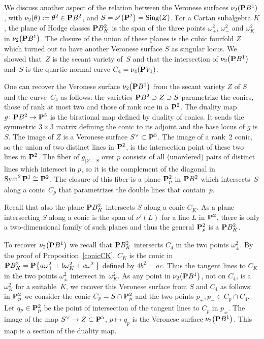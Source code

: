 \documentclass[pdftex]{sigma}
\numberwithin{equation}{section}
\begin{document}
\begin{Remark}\label{remveroneses}
We discuss another aspect of the relation between the Veronese surfaces $\nu_2({\bf P} B^1)$,
with $\nu_2(\theta):=\theta^2\in {\bf P} B^2$, and $S=\nu'\big({\bf P}^2\big)=\operatorname{Sing}(Z)$.
For a Cartan subalgebra $K$, the plane of Hodge classes ${\bf P} B^2_K$ is the span of the
three points $\omega_+^2$, $\omega_-^2$ and $\omega_K^2$ in $\nu_2\big({\bf P} B^1\big)$. The closure of
the union of these planes is the cubic fourfold $Z$ which turned out to have another Veronese surface
$S$ as singular locus.
We showed that~$Z$ is the secant variety of~$S$
and that the intersection of $\nu_2\big({\bf P} B^1\big)$ and~$S$ is the quartic normal curve
$C_4=\nu_4({\bf P} V_1)$.

One can recover the Veronese surface $\nu_2\big({\bf P} B^1\big)$ from the secant variety $Z$ of $S$ and the
curve~$C_4$ as follows: the varieties ${\bf P} B^2\supset Z\supset S$
parametrize the conics, those of rank at most two and those of rank one in a ${\bf P}^2$.
The duality map $g\colon {\bf P} B^2\rightarrow {\bf P}^5$ is the birational map defined by
duality of conics. It sends the symmetric $3\times 3$ matrix defining the conic to its adjoint and
the base locus of $g$ is $S$.
The image of $Z$ is a Veronese surface $S^\vee\subset{\bf P}^5$. The image of a rank~2 conic,
so the union of two distinct lines in ${\bf P}^2$, is the intersection point of these two lines in ${\bf P}^2$.
The fiber of $g_{|Z-S}$ over $p$ consists of all (unordered) pairs of distinct lines
which intersect in $p$, so it is the complement of the diagonal in $\operatorname{Sym}^2{\bf P}^1\cong {\bf P}^2$.
The closure of this fiber is a plane ${\bf P}^2_p$ in ${\bf P} B^2$ which intersects~$S$ along a conic~$C_p$
that parametrizes the double lines that contain~$p$.

Recall that also the plane ${\bf P} B^2_K$ intersects $S$ along a conic $C_K$. As a plane intersecting
$S$ along a conic is the span of $\nu'(L)$ for a line $L$ in ${\bf P}^2$, there is only
a two-dimensional family of such planes and thus the general ${\bf P}^2_p$ is a ${\bf P} B^2_K$.

To recover $\nu_2\big({\bf P} B^1\big)$ we recall that ${\bf P} B^2_K$ intersects $C_4$ in the two points $\omega_\pm^2$.
By the proof of Proposition~\ref{conicCK},
$C_K$ is the conic in ${\bf P} B^2_K={\bf P}\big\{a\omega_+^2+b\omega_K^2+c\omega_-^2\big\}$ defined by $4b^2=ac$.
Thus the tangent lines to $C_K$ in the two points $\omega_\pm^2$ intersect in~$\omega_K^2$.
As any point in $\nu_2\big({\bf P} B^1\big)$, not on $C_4$, is a $\omega_K^2$ for a suitable~$K$,
we recover this Veronese surface from $S$ and $C_4$ as follows: in ${\bf P}^2_p$ we consider
the conic $C_p=S\cap {\bf P}^2_p$ and the two points $p_+,p_-\in C_p\cap C_4$. Let
$q_p\in {\bf P}^2_p$ be the point of intersection of the tangent lines to $C_p$ in $p_\pm$.
The image of the map $S^\vee\rightarrow Z\subset {\bf P}^5$, $p\mapsto q_p$
is the Veronese surface $\nu_2\big({\bf P} B^1\big)$. This map is a section of the duality map.
\end{Remark}
\end{document}
